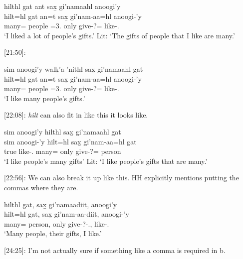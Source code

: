 \begin{exe}
    \ex \glll hilthl gat ant sax̱ gi'namaahl anoogi'y \\
    hilt=hl gat an=t sax̱ gi'nam-aa=hl anoogi-'y  \\
    many=\Cn{} people \Ax{}=3.\I{} only give-\Nmlz{}?=\Cn{} like-\Fsg{}.\Ii{} \\
    `I liked a lot of people's gifts.'  Lit: `The gifts of people that I like are many.'
\end{exe}

[21:50]:

\begin{exe}
    \ex \glll sim anoogi'y walḵ'a 'nithl sax̱ gi'namaahl gat \\
    hilt=hl gat an=t sax̱ gi'nam-aa=hl anoogi-'y  \\
    many=\Cn{} people \Ax{}=3.\I{} only give-\Nmlz{}?=\Cn{} like-\Fsg{}.\Ii{} \\
    `I like many people's gifts.'
\end{exe}

[22:08]: \textit{hilt} can also fit in like this it looks like. 

\begin{exe}
    \ex \glll sim anoogi'y hilthl sax̱ gi'namaahl gat \\
    sim anoogi-'y hilt=hl sax̱ gi'nam-aa=hl gat \\
    true like-\Fsg{}.\Ii{} many=\Cn{} only give-\Nmlz{}?=\Cn{} person \\
    `I like people's many gifts' Lit: `I like people's gifts that are many.'
\end{exe}

[22:56]: We can also break it up like this. HH explicitly mentions putting the commas where they are.

\begin{exe}
    \ex \glll hilthl gat, sax̱ gi'namaadiit, anoogi'y \\
    hilt=hl gat, sax̱ gi'nam-aa-diit, anoogi-'y\\
    many=\Cn{} person, only give-\Nmlz{}?-\Tpl{}.\Ii{}, like-\Fsg{}.\Ii{} \\
    `Many people, their gifts, I like.'
\end{exe}

[24:25]: I'm not actually sure if something like a comma is required in b.

